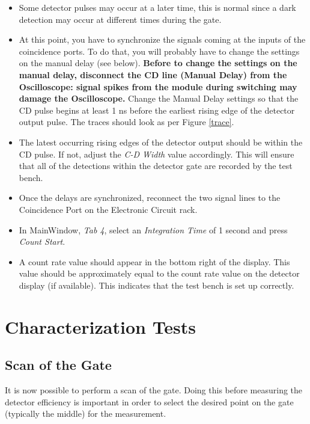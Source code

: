 \documentclass{article}
\begin{document}
\begin{itemize}
\item
Some detector pulses may occur at a later time, this is normal since a dark detection may occur at different times during the gate.
\item
At this point, you have to synchronize the signals coming at the inputs of the coincidence ports. To do that, you will probably have to change the settings on the manual delay (see below). {\bf Before to change the settings on the manual delay, disconnect the CD line (Manual Delay) from the Oscilloscope:  signal spikes from the module during switching may damage the Oscilloscope.}
Change the Manual Delay settings so that the CD pulse begins at least 1 ns before the earliest rising edge of the detector output pulse. The traces should look as per Figure \ref{trace}.

\item
The latest occurring rising edges of the detector output should be within the CD pulse. If not, adjust the \emph{C-D Width} value accordingly. This will ensure that all of the detections within the detector gate are recorded by the test bench.

\item
Once the delays are synchronized, reconnect the two signal lines to the Coincidence Port on the Electronic Circuit rack.

\item
In MainWindow, \emph{Tab 4}, select an \emph{Integration Time} of 1 second and press \emph{Count Start}.

\item 
A count rate value should appear in the bottom right of the display. This value should be approximately equal to the count rate value on the detector display (if available). This indicates that the test bench is set up correctly. 

\end{itemize} 
 
 
\section{Characterization Tests}

\subsection{Scan of the Gate}


It is now possible to perform a scan of the gate. Doing this before measuring the detector efficiency is important in order to select the desired point on the gate (typically the middle) for the measurement.
\end{document}
